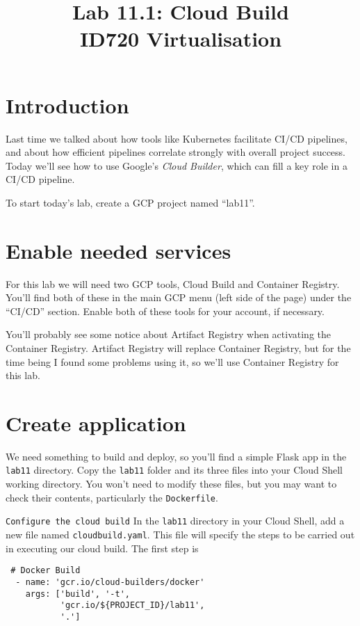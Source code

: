 \documentclass{article}
\begin{document}
\title{Lab 11.1: Cloud Build\\ID720 Virtualisation}
\date{}
\maketitle

\section*{Introduction}
Last time we talked about how tools like Kubernetes facilitate CI/CD pipelines, and about how efficient pipelines correlate strongly with overall project success. Today we'll see how to use Google's \emph{Cloud Builder}, which can fill a key role in a CI/CD pipeline.

To start today's lab, create a GCP project named ``lab11''. 

\section{Enable needed services}
For this lab we will need two GCP tools, Cloud Build and Container Registry. You'll find both of these in the main GCP menu (left side of the page) under the ``CI/CD'' section. Enable both of these tools for your account, if necessary.

You'll probably see some notice about Artifact Registry when activating the Container Registry. Artifact Registry will replace Container Registry, but for the time being I found some problems using it, so we'll use Container Registry for this lab.

\section{Create application}
We need something to build and deploy, so you'll find a simple Flask app in the \texttt{lab11} directory. Copy the \texttt{lab11} folder and its three files into your Cloud Shell working directory. You won't need to modify these files, but you may want to check their contents, particularly the \texttt{Dockerfile}.

\texttt{Configure the cloud build}
In the \texttt{lab11} directory in your Cloud Shell, add a new file named \texttt{cloudbuild.yaml}. This file will specify the steps to be carried out in executing our cloud build. The first step is

\begin{verbatim}
 # Docker Build
  - name: 'gcr.io/cloud-builders/docker'
    args: ['build', '-t', 
           'gcr.io/${PROJECT_ID}/lab11', 
           '.']
\end{verbatim}
           
\end{document}
